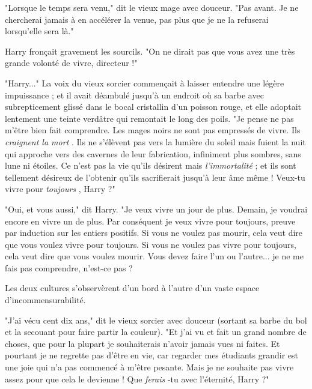 "Lorsque le temps sera venu," dit le vieux mage avec douceur. "Pas avant. Je ne chercherai jamais à en accélérer la venue, pas plus que je ne la refuserai lorsqu'elle sera là."

Harry fronçait gravement les sourcils. "On ne dirait pas que vous avez une très grande volonté de vivre, directeur !"

"Harry..." La voix du vieux sorcier commençait à laisser entendre une légère impuissance ; et il avait déambulé jusqu'à un endroit où sa barbe avec subrepticement glissé dans le bocal cristallin d'un poisson rouge, et elle adoptait lentement une teinte verdâtre qui remontait le long des poils. "Je pense ne pas m'être bien fait comprendre. Les mages noirs ne sont pas empressés de vivre. Ils \emph{craignent la mort} . Ils ne s'élèvent pas vers la lumière du soleil mais fuient la nuit qui approche vers des cavernes de leur fabrication, infiniment plus sombres, sans lune ni étoiles. Ce n'est pas la vie qu'ils désirent mais \emph{l'immortalité}  ; et ils sont tellement désireux de l'obtenir qu'ils sacrifierait jusqu'à leur âme même ! Veux-tu vivre pour \emph{toujours} , Harry ?"

"Oui, et vous aussi," dit Harry. "Je veux vivre un jour de plus. Demain, je voudrai encore en vivre un de plus. Par conséquent je veux vivre pour toujours, preuve par induction sur les entiers positifs. Si vous ne voulez pas mourir, cela veut dire que vous voulez vivre pour toujours. Si vous ne voulez pas vivre pour toujours, cela veut dire que vous voulez mourir. Vous devez faire l'un ou l'autre... je ne me fais pas comprendre, n'est-ce pas ?

Les deux cultures s'observèrent d'un bord à l'autre d'un vaste espace d'incommensurabilité.

"J'ai vécu cent dix ans," dit le vieux sorcier avec douceur (sortant sa barbe du bol et la secouant pour faire partir la couleur). "Et j'ai vu et fait un grand nombre de choses, que pour la plupart je souhaiterais n'avoir jamais vues ni faites. Et pourtant je ne regrette pas d'être en vie, car regarder mes étudiants grandir est une joie qui n'a pas commencé à m'être pesante. Mais je ne souhaite pas vivre assez pour que cela le devienne ! Que \emph{ferais} -tu avec l'éternité, Harry ?"

